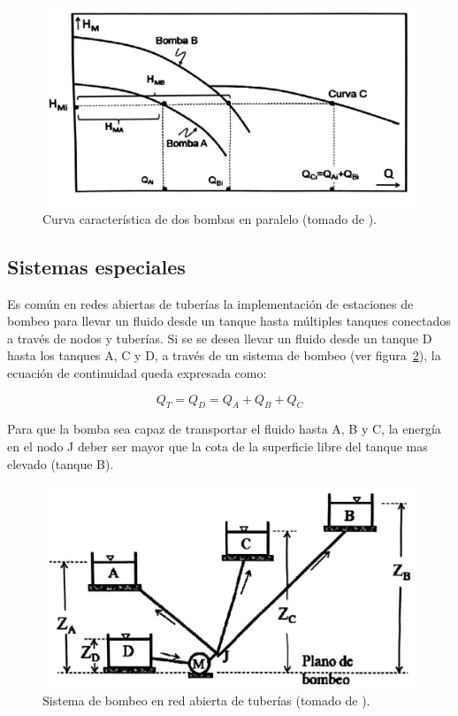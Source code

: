 \documentclass[11pt, oneside]{article}
\begin{document}
\begin{figure}[h]
\centering
\includegraphics[width=12cm]{./figs/bom25.jpeg}
\caption{Curva caracter\'istica de dos bombas en paralelo (tomado de \cite{agudelo2011mecanica}).} 
\label{bom25}
\end{figure}


\subsection{Sistemas especiales}
Es com\'un en redes abiertas de tuber\'ias la implementaci\'on de estaciones de bombeo para llevar un fluido desde un tanque hasta m\'ultiples tanques conectados a trav\'es de nodos y tuber\'ias. Si se se desea llevar un fluido desde un tanque D hasta los tanques A, C y D, a trav\'es de un sistema de bombeo (ver figura~\ref{bom26}),  la ecuaci\'on de continuidad queda expresada como:

\begin{equation}
Q_T = Q_D= Q_A + Q_B + Q_C
\label{boma26}
\end{equation}

Para que la bomba sea capaz de transportar el fluido hasta A, B y C, la energ\'ia en el nodo J deber ser mayor que la cota de la superficie libre del tanque mas elevado (tanque B).  

\begin{figure}[h]
\centering
\includegraphics[width=12cm]{./figs/bom26.jpeg}
\caption{Sistema de bombeo en red abierta de tuber\'ias (tomado de \cite{agudelo2011mecanica}).} 
\label{bom26}
\end{figure}
\end{document}
